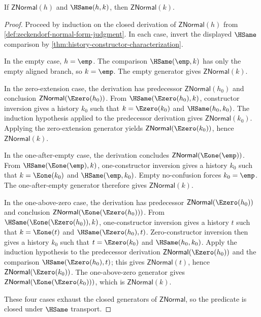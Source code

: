 \begin{theorem}
\label{thm:znormal-hsame-transport}
If $\mathsf{ZNormal}(h)$ and $\HSame(h,k)$, then $\mathsf{ZNormal}(k)$.
\end{theorem}
\begin{proof}
Proceed by induction on the closed derivation of $\mathsf{ZNormal}(h)$ from \autoref{def:zeckendorf-normal-form-judgment}. In each case, invert the displayed $\HSame$ comparison by \autoref{thm:history-constructor-characterization}.

In the empty case, $h=\emp$. The comparison $\HSame(\emp,k)$ has only the empty aligned branch, so $k=\emp$. The empty generator gives $\mathsf{ZNormal}(k)$.

In the zero-extension case, the derivation has predecessor $\mathsf{ZNormal}(h_0)$ and conclusion $\mathsf{ZNormal}(\Ezero(h_0))$. From $\HSame(\Ezero(h_0),k)$, constructor inversion gives a history $k_0$ such that $k=\Ezero(k_0)$ and $\HSame(h_0,k_0)$. The induction hypothesis applied to the predecessor derivation gives $\mathsf{ZNormal}(k_0)$. Applying the zero-extension generator yields $\mathsf{ZNormal}(\Ezero(k_0))$, hence $\mathsf{ZNormal}(k)$.

In the one-after-empty case, the derivation concludes $\mathsf{ZNormal}(\Eone(\emp))$. From $\HSame(\Eone(\emp),k)$, one-constructor inversion gives a history $k_0$ such that $k=\Eone(k_0)$ and $\HSame(\emp,k_0)$. Empty no-confusion forces $k_0=\emp$. The one-after-empty generator therefore gives $\mathsf{ZNormal}(k)$.

In the one-above-zero case, the derivation has predecessor $\mathsf{ZNormal}(\Ezero(h_0))$ and conclusion $\mathsf{ZNormal}(\Eone(\Ezero(h_0)))$. From $\HSame(\Eone(\Ezero(h_0)),k)$, one-constructor inversion gives a history $t$ such that $k=\Eone(t)$ and $\HSame(\Ezero(h_0),t)$. Zero-constructor inversion then gives a history $k_0$ such that $t=\Ezero(k_0)$ and $\HSame(h_0,k_0)$. Apply the induction hypothesis to the predecessor derivation $\mathsf{ZNormal}(\Ezero(h_0))$ and the comparison $\HSame(\Ezero(h_0),t)$; this gives $\mathsf{ZNormal}(t)$, hence $\mathsf{ZNormal}(\Ezero(k_0))$. The one-above-zero generator gives $\mathsf{ZNormal}(\Eone(\Ezero(k_0)))$, which is $\mathsf{ZNormal}(k)$.

These four cases exhaust the closed generators of $\mathsf{ZNormal}$, so the predicate is closed under $\HSame$ transport.
\end{proof}
